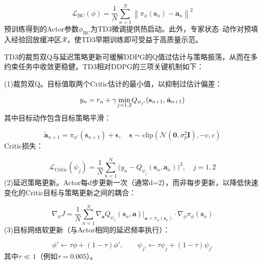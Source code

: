 \begin{equation}
\label{eq:78}
{\mathcal{L}_{{\text{BC}}}}(\phi ) = \frac{1}{N}\sum\limits_{n = 1}^N {{{\left\| {{\pi _\phi }({{\mathbf{s}}_n}) - {{\mathbf{a}}_n}} \right\|}^2}} 
\end{equation}
预训练得到的Actor参数${\phi _{{\text{BC}}}}$为TD3微调提供热启动。此外，专家状态–动作对预填入经验回放缓冲区$\mathcal{R}$，使TD3早期训练即可受益于高质量示范。

TD3的裁剪双Q与延迟策略更新可缓解DDPG的Q值过估计与策略振荡，从而在多约束任务中收敛更稳健。TD3相对DDPG的三项关键机制如下：

(1)裁剪双Q。目标值取两个Critic估计的最小值，以抑制过估计偏差：

\begin{equation}
\label{eq:79}
{y_n} = {r_n} + \gamma {\kern 1pt} {\min _{j = 1,2}}{Q_{{\psi _{j'}}}}({{\mathbf{s}}_{n + 1}},{\kern 1pt} {\tilde{\mathbf{a}}_{n + 1}})
\end{equation}
其中目标动作包含目标策略平滑：

\begin{equation}
\label{eq:80}
{\tilde{\mathbf{a}}_{n + 1}} = {\pi _{\phi '}}({{\mathbf{s}}_{n + 1}}) + {\boldsymbol{\epsilon }},\quad {\boldsymbol{\epsilon }} \sim {\text{clip}}\left( {\mathcal{N}({\mathbf{0}},\sigma _p^2{\mathbf{I}}), - c,c} \right)
\end{equation}
Critic损失：

\begin{equation}
\label{eq:81}
{\mathcal{L}_{{\text{Critic}}}}({\psi _j}) = \frac{1}{N}\sum\limits_{n = 1}^N ( {y_n} - {Q_{{\psi _j}}}({{\mathbf{s}}_n},{{\mathbf{a}}_n}){)^2},\quad j = 1,2
\end{equation}
(2)延迟策略更新。Actor每d步更新一次（通常d=2），而非每步更新，以降低快速变化的Critic目标与策略更新之间的耦合：

\begin{equation}
\label{eq:82}
{\nabla _\phi }J = \frac{1}{N}\sum\limits_{n = 1}^N {{\nabla _{\mathbf{a}}}} {Q_{{\psi _1}}}({{\mathbf{s}}_n},{\mathbf{a}}){|_{{\mathbf{a}} = {\pi _\phi }({{\mathbf{s}}_n})}} \cdot {\nabla _\phi }{\pi _\phi }({{\mathbf{s}}_n})
\end{equation}
(3)目标网络软更新（与Actor相同的延迟频率执行）：

\begin{equation}
\label{eq:83}
\phi ' \leftarrow \tau \phi  + (1 - \tau )\phi ',\qquad {\psi _{j'}} \leftarrow \tau {\psi _j} + (1 - \tau ){\psi _{j'}}
\end{equation}
其中$\tau  \ll 1$（例如$\tau  = 0.005$）。

